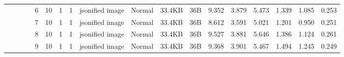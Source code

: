 \begin{landscape}
\begin{table}[]
{\begin{tabular}{@{}ccccllllllllllllll@{}}
                                                                                   &                              &                                &                                                                                                          & 6                                                     & 10                                       & 1                                          & 1                                 & jsonified image                  & Normal                             & 33.4KB                                        & 36B                                             & 9.352                   & 3.879    & 5.473                        & 1.339                   & 1.085    & 0.253                        \\
                                                                                   &                              &                                &                                                                                                          & 7                                                     & 10                                       & 1                                          & 1                                 & jsonified image                  & Normal                             & 33.4KB                                        & 36B                                             & 8.612                   & 3.591    & 5.021                        & 1.201                   & 0.950    & 0.251                        \\
                                                                                   &                              &                                &                                                                                                          & 8                                                     & 10                                       & 1                                          & 1                                 & jsonified image                  & Normal                             & 33.4KB                                        & 36B                                             & 9.527                   & 3.881    & 5.646                        & 1.386                   & 1.124    & 0.261                        \\
                                                                                   &                              &                                &                                                                                                          & 9                                                     & 10                                       & 1                                          & 1                                 & jsonified image                  & Normal                             & 33.4KB                                        & 36B                                             & 9.368                   & 3.901    & 5.467                        & 1.494                   & 1.245    & 0.249                        \\

\end{tabular}}
\end{table}
\end{landscape}
